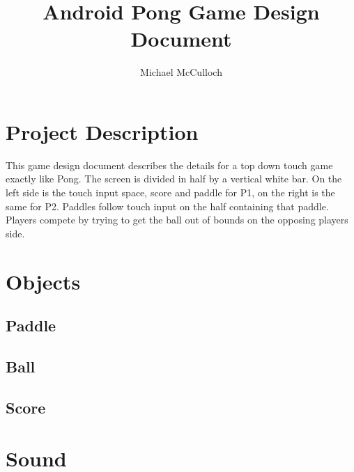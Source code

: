 \documentclass[12pt, letterpaper]{article}
\title{Android Pong Game Design Document}
\author{Michael McCulloch}
\begin{document}
\maketitle
\pagebreak
\tableofcontents
\pagebreak
\section{Project Description}
This game design document describes the details for a 
top down touch game exactly like Pong. The screen is divided in half by a vertical white bar. On the left side is the touch input space, score and paddle for P1, on the right is the same for P2. Paddles follow touch input on the half containing that paddle. Players compete by trying to get the ball out of bounds on the opposing players side.

\section{Objects}
\subsection{Paddle}
\subsection{Ball}
\subsection{Score}

\section{Sound}
\end{document}

